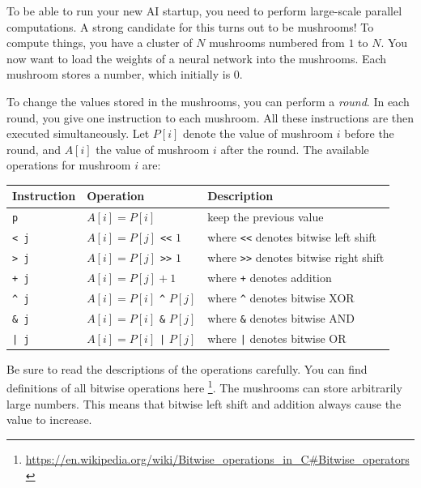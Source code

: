 \noindent


To be able to run your new AI startup, you need to perform large-scale parallel computations.
A strong candidate for this turns out to be mushrooms!
To compute things, you have a cluster of $N$ mushrooms numbered from $1$ to $N$.
You now want to load the weights of a neural network into the mushrooms.
Each mushroom stores a number, which initially is $0$.

To change the values stored in the mushrooms, you can perform a \textit{round}.
In each round, you give one instruction to each mushroom.
All these instructions are then executed simultaneously.
Let $P[i]$ denote the value of mushroom $i$ before the round, and $A[i]$ the value of mushroom $i$ after the round.
The available operations for mushroom $i$ are:

\begin{table}[h!]\centering
\begin{tabular}{l p{3cm} l}
\textbf{Instruction} & \textbf{Operation} & \textbf{Description} \\ \hline
\texttt{p}       & $A[i] = P[i]$ & keep the previous value \\
\texttt{< j}     & $A[i] = P[j]$ \texttt{<<} $1$ & where \texttt{<<} denotes bitwise left shift \\
\texttt{> j}     & $A[i] = P[j]$ \texttt{>>} $1$ & where \texttt{>>} denotes bitwise right shift \\
\texttt{+ j}     & $A[i] = P[j] + 1$ & where \texttt{+} denotes addition \\
\texttt{\^{} j}  & $A[i] = P[i]$ \texttt{\^} $P[j]$ & where \texttt{\^} denotes bitwise XOR \\
\texttt{\& j}    & $A[i] = P[i]$ \texttt{\&} $P[j]$ & where \texttt{\&} denotes bitwise AND \\
\texttt{| j}     & $A[i] = P[i]$ \texttt{|} $P[j]$ & where \texttt{|} denotes bitwise OR \\
\end{tabular}
\end{table}

Be sure to read the descriptions of the operations carefully.
You can find definitions of all bitwise operations here
\footnote{\href{https://en.wikipedia.org/wiki/Bitwise\_operations\_in\_C\#Bitwise\_operators}{https://en.wikipedia.org/wiki/Bitwise\_operations\_in\_C\#Bitwise\_operators}}.
The mushrooms can store arbitrarily large numbers.
This means that bitwise left shift and addition always cause the value to increase.

